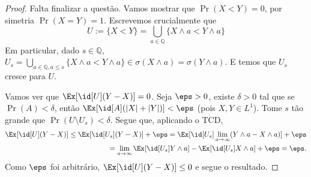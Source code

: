 \begin{proof}
	Falta finalizar a questão. Vamos mostrar que $\Pr(X < Y) = 0$, por
	simetria $\Pr(X = Y) = 1$. Escrevemos crucialmente que
	\[
		U := \{X < Y\} = \bigcup_{a \in \mathbb{Q}} \{X \land a < Y \land a\}
	\]
	Em particular, dado $s \in \mathbb{Q}$, $U_s = \bigcup_{a \in
	\mathbb{Q}, a \leq s}\{X \land a < Y \land a\} \in \sigma(X \land a)
	= \sigma(Y \land a)$. E temos que
	$U_s$ cresce para $U$.

	Vamos ver que $\Ex[\id[U](Y - X)] = 0$. Seja $\eps > 0$, existe
	$\delta > 0$ tal que se $\Pr(A) < \delta$, então $\Ex[\id[A] (|X| +
	|Y|)] < \eps$ (pois $X,Y \in L^1$).
	Tome $s$ tão grande que $\Pr(U\setminus U_s) < \delta$. Segue que,
	aplicando o TCD,
	\begin{align*}
		\Ex[\id[U](Y - X)] \leq \Ex[\id[U_s] (Y - X)] + \eps = \Ex[\id[U_s]
		\lim_{a \to \infty} (Y\land a - X\land a)] + \eps\\
		= \lim_{a \to \infty} \Ex[\id[U_s] Y\land a] - \Ex[\id[U_s] X \land
		a] + \eps = \eps.
	\end{align*}
	Como $\eps$ foi arbitrário, $\Ex[\id[U](Y - X)] \leq 0$ e segue o resultado.
\end{proof}

\begin{exercise}[5]
\end{exercise}


